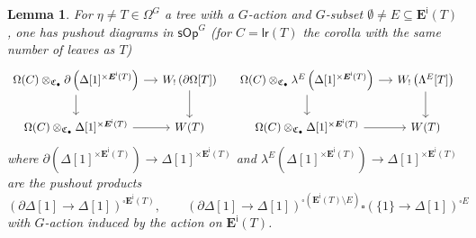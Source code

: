 \documentclass[a4paper,10pt
,draft
]{article}%
\numberwithin{equation}{section}
\numberwithin{figure}{section}
\newtheorem{lemma}[equation]{Lemma}%
\theoremstyle{definition} %
\newcommand{\sOp}{\ensuremath{\mathsf{sOp}}}%
\newcommand{\1}{\ensuremath{\mathbbm 1}}%
\begin{document}
\begin{lemma}\label{WLEFTQPUSH LEM}
      For $\eta \neq T \in \Omega^G$
      a tree with a $G$-action
      and $G$-subset $\emptyset \neq E \subseteq \boldsymbol{E}^{\mathsf{i}}(T)$,
      one has pushout diagrams in $\sOp^G$
      (for $C=\mathsf{lr}(T)$
      the corolla with the same number of leaves as $T$)
\begin{equation}\label{WLEFTQPUSH_EQ}
\begin{tikzcd}[column sep = small]
	\Omega(C) \otimes_{\mathfrak C_\bullet}
	\partial \left(\Delta[1]^{\times \boldsymbol{E}^{\mathsf{i}}(T)}\right)
	\ar{r} \ar{d}
&
	W_! \left(\partial \Omega[T]\right) 
	\arrow[d]
& %
	\Omega(C) \otimes_{\mathfrak C_\bullet}
	\lambda^E \left(
	\Delta[1]^{\times \boldsymbol{E}^{\mathsf{i}}(T)}
	\right)
	\ar{r} \ar{d}
&
	W_! \left(\Lambda^E[T]\right) 
	\arrow[d]
\\
	\Omega(C) \otimes_{\mathfrak C_\bullet}
	\Delta[1]^{\times \boldsymbol{E}^{\mathsf{i}}(T)}
	\ar{r}
&
	W(T)
& %
	\Omega(C) \otimes_{\mathfrak C_\bullet}
	\Delta[1]^{\times \boldsymbol{E}^{\mathsf{i}}(T)}
	\ar{r}
&
	W(T)
\end{tikzcd}
\end{equation}
      where
      $\partial \left(\Delta[1]^{\times \boldsymbol{E}^{\mathsf{i}}(T)}\right)
      \to
      \Delta[1]^{\times \boldsymbol{E}^{\mathsf{i}}(T)}$
      and
      $\lambda^E
      \left(
      \Delta[1]^{\times \boldsymbol{E}^{\mathsf{i}}(T)}
      \right)
      \to \Delta[1]^{\times \boldsymbol{E}^{\mathsf{i}}(T)}$
      are the pushout products
\[
	\left(
	\partial\Delta[1] \to \Delta[1]
	\right)^{\square \boldsymbol E^{\mathsf{i}}(T)},
\qquad
	\left(
	\partial \Delta[1] \to \Delta[1]
	\right)^{\square (\boldsymbol{E}^{\mathsf{i}}(T) \setminus E)}
	\square
	\left(
	\{1\} \to \Delta[1]
	\right)^{\square E}
\]
      with $G$-action induced by the action on $\boldsymbol{E}^{\mathsf{i}}(T)$.
\end{lemma}
\end{document}
